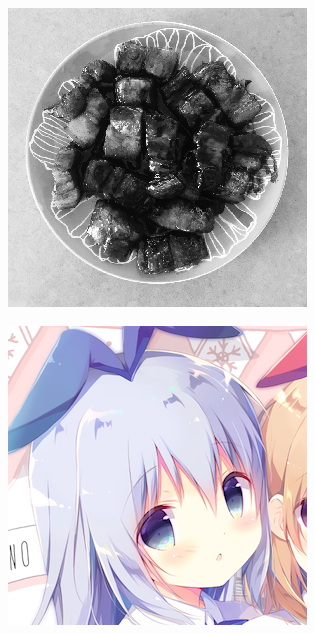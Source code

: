 \documentclass{article}
\begin{document}
\begin{enumerate}[label=B\arabic*)]
\begin{figure}[h!]
\begin{minipage}{0.48\textwidth}
			\end{minipage}
			\hfill
			\begin{minipage}{0.48\textwidth}
				\centering
				\includegraphics[width=0.6\linewidth]{Pork/Gray.png}
			\end{minipage}
		\end{figure}
		\begin{figure}[h!]
			\begin{minipage}{0.32\textwidth}
				\centering
				\includegraphics[width=0.8\linewidth]{Chino/Original.png}
			\end{minipage}
			\hfill
			\begin{minipage}{0.32\textwidth}
				\centering

\end{minipage}
\end{figure}
\end{enumerate}
\end{document}
